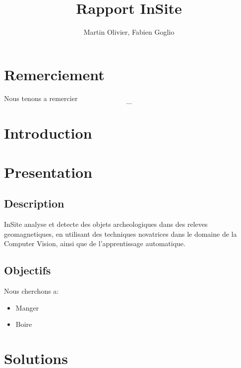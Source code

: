 \documentclass[a4paper, 12pt, titlepage, oneside]{article}
\author{Martin Olivier, Fabien Goglio}
\title{Rapport InSite}
\begin{document}
\maketitle

\newpage
	\tableofcontents
\newpage
\cleardoublepage
{}
\section{Remerciement}
	Nous tenons a remercier \[...\]
	\newpage
\section{Introduction}
	\newpage
\section{Presentation}
	\subsection{Description}
		InSite analyse et detecte des objets archeologiques dans des releves geomagnetiques, en utilisant des techniques novatrices dans le domaine de
		la Computer Vision, ainsi que de l'apprentissage automatique.
	\subsection{Objectifs}
	Nous cherchons a:
	\begin{itemize}
		\item Manger 
		\item Boire
	\end{itemize}

	\newpage
\section{Solutions}
\end{document}
